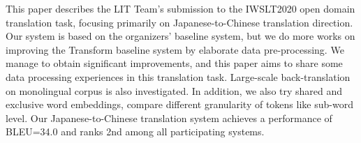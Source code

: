 This paper describes the LIT Team's submission to the IWSLT2020 open domain translation task, focusing primarily on Japanese-to-Chinese translation direction. Our system is based on the organizers' baseline system, but we do more works on improving the Transform baseline system by elaborate data pre-processing. We manage to obtain significant improvements, and this paper aims to share some data processing experiences in this translation task. Large-scale back-translation on monolingual corpus is also investigated. In addition, we also try shared and exclusive word embeddings, compare different granularity of tokens like sub-word level.  Our Japanese-to-Chinese translation system achieves a performance of BLEU=34.0 and ranks 2nd among all participating systems.
